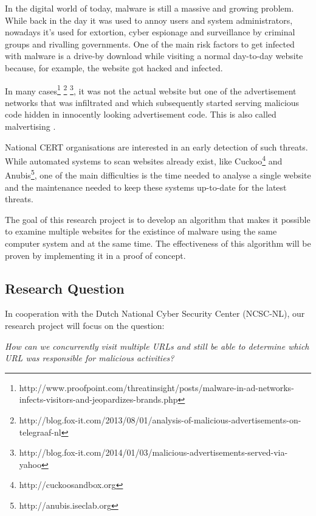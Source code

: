 
In the digital world of today, malware is still a massive and growing problem. While back in the day it was used to annoy users and system administrators, nowadays it's used for extortion, cyber espionage and surveillance by criminal groups and rivalling governments. One of the main risk factors to get infected with malware is a drive-by download while visiting a normal day-to-day website because, for example, the website got hacked and infected. 

In many cases\footnote{http://www.proofpoint.com/threatinsight/posts/malware-in-ad-networks-infects-visitors-and-jeopardizes-brands.php} \footnote{http://blog.fox-it.com/2013/08/01/analysis-of-malicious-advertisements-on-telegraaf-nl} \footnote{http://blog.fox-it.com/2014/01/03/malicious-advertisements-served-via-yahoo}, it was not the actual website but one of the advertisement networks that was infiltrated and which subsequently started serving malicious code hidden in innocently looking advertisement code. This is also called malvertising \cite{Li2012}.

National CERT organisations are interested in an early detection of such threats. While automated systems to scan websites already exist, like Cuckoo\footnote{http://cuckoosandbox.org} and Anubis\footnote{http://anubis.iseclab.org}, one of the main difficulties is the time needed to analyse a single website and the maintenance needed to keep these systems up-to-date for the latest threats.

The goal of this research project is to develop an algorithm that makes it possible to examine multiple websites for the existince of malware using the same computer system and at the same time. The effectiveness of this algorithm will be proven by implementing it in a proof of concept.



\subsection{Research Question}

In cooperation with the Dutch National Cyber Security Center (NCSC-NL), our research project will focus on the question:

\textit{How can we concurrently visit multiple URLs and still be able to determine which URL was responsible for malicious activities?}

